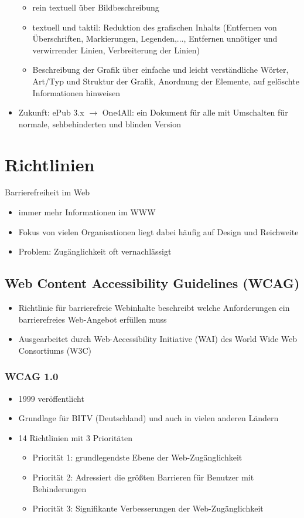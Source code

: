 \documentclass[paper=a4, fontsize=11pt]{scrartcl} %
\numberwithin{equation}{section} %
\numberwithin{figure}{section} %
\numberwithin{table}{section} %
\begin{document}
\begin{itemize}
\begin{itemize}
\item rein textuell über Bildbeschreibung
\item textuell und taktil: Reduktion des grafischen Inhalts (Entfernen von Überschriften, Markierungen, Legenden,..., Entfernen unnötiger und verwirrender Linien, Verbreiterung der Linien)
\item Beschreibung der Grafik über einfache und leicht verständliche Wörter, Art/Typ und Struktur der Grafik, Anordnung der Elemente, auf gelöschte Informationen hinweisen
\end{itemize}
\item Zukunft: ePub 3.x $\rightarrow$ One4All: ein Dokument für alle mit Umschalten für normale, sehbehinderten und blinden Version
\end{itemize}

\section{Richtlinien}

Barrierefreiheit im Web
\begin{itemize}
\item immer mehr Informationen im WWW
\item Fokus von vielen Organisationen liegt dabei häufig auf Design und Reichweite
\item Problem: Zugänglichkeit oft vernachlässigt
\end{itemize}

\subsection{Web Content Accessibility Guidelines (WCAG)}

\begin{itemize}
\item Richtlinie für barrierefreie Webinhalte beschreibt welche Anforderungen ein barrierefreies Web-Angebot erfüllen muss
\item Ausgearbeitet durch Web-Accessibility Initiative (WAI) des World Wide Web Consortiums (W3C)
\end{itemize}

\subsubsection{WCAG 1.0}

\begin{itemize}
\item 1999 veröffentlicht
\item Grundlage für BITV (Deutschland) und auch in vielen anderen Ländern
\item 14 Richtlinien mit 3 Prioritäten
\begin{itemize}
\item Priorität 1: grundlegendste Ebene der Web-Zugänglichkeit
\item Priorität 2: Adressiert die größten Barrieren für Benutzer mit Behinderungen
\item Priorität 3: Signifikante Verbesserungen der Web-Zugänglichkeit
\end{itemize}
\end{itemize}
\end{document}
